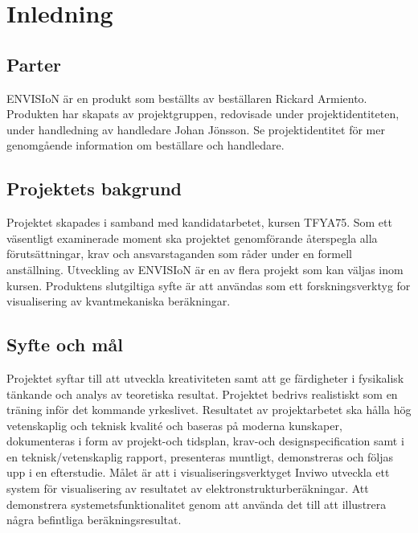 \section{Inledning}

\subsection{Parter}
ENVISIoN är en produkt som beställts av beställaren Rickard Armiento. Produkten har skapats av projektgruppen, redovisade under projektidentiteten, under handledning av handledare Johan Jönsson. Se projektidentitet för mer genomgående information om beställare och handledare.    


\subsection{Projektets bakgrund} 
Projektet skapades i samband med kandidatarbetet, kursen TFYA75. Som ett väsentligt examinerade moment ska projektet genomförande återspegla alla förutsättningar, krav och ansvarstaganden som råder under en formell anställning. Utveckling av ENVISIoN är en av flera projekt som kan väljas inom kursen. Produktens slutgiltiga syfte är att användas som ett forskningsverktyg for visualisering av kvantmekaniska beräkningar.      

\subsection{Syfte och mål}
Projektet syftar till att utveckla kreativiteten samt att ge färdigheter i fysikalisk tänkande och analys av teoretiska resultat. Projektet bedrivs realistiskt som en träning inför det kommande yrkeslivet. Resultatet av projektarbetet ska hålla hög vetenskaplig och teknisk kvalité och baseras på moderna kunskaper, dokumenteras i form av projekt-och tidsplan, krav-och designspecification samt i en teknisk/vetenskaplig rapport, presenteras muntligt, demonstreras och följas upp i en efterstudie. Målet är att i visualiseringsverktyget Inviwo utveckla ett system för visualisering av resultatet av elektronstrukturberäkningar. Att demonstrera systemetsfunktionalitet genom att använda det till att illustrera några befintliga beräkningsresultat.

